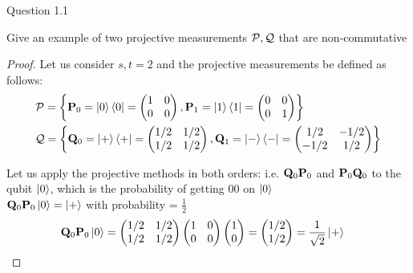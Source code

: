 \begin{solution}{Question 1.1}\label{ques:11}
    \begin{question}
    Give an example of two projective measurements $\mathcal{P} , \mathcal{Q}$ that are non-commutative
    \end{question}
    \tcblower{}
    \begin{proof}
    Let us consider $s,t=2$ and the projective measurements be defined as follows:
    \begin{equation}
        \begin{split}
        &\mathcal{P} = \left\{ \mathbf{P}_0 = \ket{0}\bra{0} = 
        \begin{pmatrix}
        1 & 0\\
        0 & 0 
        \end{pmatrix}  
        , \mathbf{P}_1 = \ket{1}\bra{1} =
        \begin{pmatrix}
        0 & 0\\
        0 & 1 
        \end{pmatrix}  \right\}\\
        &\mathcal{Q} = \left\{ \mathbf{Q}_0 = \ket{+}\bra{+} =
        \begin{pmatrix}
        1/2 & 1/2\\
        1/2 & 1/2
        \end{pmatrix}  
        , \mathbf{Q}_1 = \ket{-}\bra{-} =
        \begin{pmatrix}
        1/2 & -1/2\\
        -1/2 & 1/2 
        \end{pmatrix}  \right\}
        \end{split}
    \end{equation}

    Let us apply the projective methods in both orders: i.e. $\mathbf{Q}_0\mathbf{P}_0$ and $\mathbf{P}_0\mathbf{Q}_0$ to the qubit $\ket{0}$, which is the probability of getting 00 on $\ket{0}$\\

     $\mathbf{Q}_0\mathbf{P}_0\ket{0}=\ket{+}$ with probability = $\frac{1}{2}$
     \begin{equation}
         \begin{split}
            &\mathbf{Q}_0\mathbf{P}_0\ket{0} = 
            \begin{pmatrix}
            1/2 & 1/2\\
            1/2 & 1/2 
            \end{pmatrix}
            \begin{pmatrix}
            1 & 0\\
            0 & 0 
            \end{pmatrix}
            \begin{pmatrix}
            1 \\
            0 
            \end{pmatrix} =
            \begin{pmatrix}
            1/2 \\
            1/2 
            \end{pmatrix} = 
            \frac{1}{\sqrt{2}}\ket{+}
        \end{split}
     \end{equation}


\end{proof}
\end{solution}
